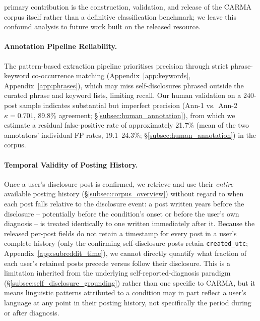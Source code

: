 \documentclass[letterpaper]{article} %
\begin{document}
primary contribution is the construction, validation, and release of the CARMA corpus itself rather than a definitive classification benchmark; we leave this confound analysis to future work built on the released resource.

\paragraph{Annotation Pipeline Reliability.}
The pattern-based extraction pipeline prioritises precision through strict phrase-keyword co-occurrence matching (Appendix~\ref{app:keywords}, Appendix~\ref{app:phrases}), which may miss self-disclosures phrased outside the curated phrase and keyword lists, limiting recall. Our human validation on a 240-post sample indicates substantial but imperfect precision (Ann-1 vs.\ Ann-2 $\kappa = 0.701$, 89.8\% agreement; §\ref{subsec:human_annotation}), from which we estimate a residual false-positive rate of approximately 21.7\% (mean of the two annotators' individual FP rates, 19.1--24.3\%; §\ref{subsec:human_annotation}) in the corpus.

\paragraph{Temporal Validity of Posting History.}
Once a user's disclosure post is confirmed, we retrieve and use their \textit{entire} available posting history (\S\ref{subsec:corpus_overview}) without regard to when each post falls relative to the disclosure event: a post written years before the disclosure -- potentially before the condition's onset or before the user's own diagnosis -- is treated identically to one written immediately after it. Because the released per-post fields do not retain a timestamp for every post in a user's complete history (only the confirming self-disclosure posts retain \texttt{created\_utc}; Appendix~\ref{app:subreddit_time}), we cannot directly quantify what fraction of each user's retained posts precede versus follow their disclosure. This is a limitation inherited from the underlying self-reported-diagnosis paradigm (\S\ref{subsec:self_disclosure_grounding}) rather than one specific to CARMA, but it means linguistic patterns attributed to a condition may in part reflect a user's language at any point in their posting history, not specifically the period during or after diagnosis.
\end{document}
